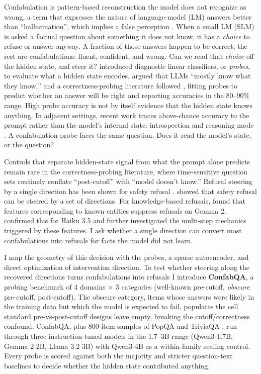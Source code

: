 Confabulation is pattern-based reconstruction the model does not recognize as wrong, 
a term that expresses the nature of language-model (LM) answers better than ``hallucination'', which implies a false perception \citep{smith2023confabulation, farquhar2024semantic}. 
When a small LM (SLM) is asked a factual question about
something it does not know, it has a \emph{choice} to refuse or answer anyway.
A fraction of those answers happen to be correct; the rest are
confabulations: fluent, confident, and wrong.
Can we read that \emph{choice} off the
hidden state, and steer it? \citet{alain2017probes} introduced diagnostic linear classifiers, or
\emph{probes}, to evaluate what a hidden state encodes. \citet{kadavath2022know}
argued that LLMs ``mostly know what they know,'' and a correctness-probing
literature followed
\citep{azaria2023internal, marks2024geometry, orgad2024show, kossen2024semantic}, fitting probes to predict
whether an answer will be right and reporting accuracies in the \(80\)--\(90\%\) range.
High probe accuracy is not by itself evidence that the hidden state
knows anything. In adjacent settings, recent work traces above-chance
accuracy to the prompt rather than the model's internal state:
introspection \citep{singh2026introspect} and reasoning mode
\citep{sahoo2026linear}. A confabulation probe faces the same question.
Does it read the model's state, or the question?

Controls that separate hidden-state signal from what the prompt alone
predicts remain rare in the correctness-probing literature, where
time-sensitive question sets routinely conflate ``post-cutoff'' with
``model doesn't know.'' Refusal steering by a single direction has been shown for safety refusal \citep{arditi2024refusal}.
\citet{wollschlager2025geometry} showed that safety refusal can be steered by a set of directions. 
For knowledge-based refusals, \citet{ferrando2025entity} found that features corresponding to known entities suppress refusals on Gemma 2. 
\citet{lindsey2025biology} confirmed this for Haiku 3.5 and further investigated the multi-step mechanics triggered by these features.
I ask whether a single direction can convert most confabulations into refusals for facts the model did not learn.

I map the geometry of this decision with the probes, a sparse
autoencoder, and direct optimization of intervention direction.
To test whether steering along the recovered directions turns
confabulations into refusals I introduce \textbf{ConfabQA}, a probing benchmark of 4 domains
\(\times\) 3 categories (well-known pre-cutoff, \emph{obscure}
pre-cutoff, post-cutoff). The obscure category, items whose answers were likely in the training data but which the model is expected to fail, populates
the cell standard pre-vs-post-cutoff designs leave empty, breaking the
cutoff/correctness confound. ConfabQA, plus 800-item samples of PopQA
\citep{mallen2023popqa} and TriviaQA \citep{joshi2017triviaqa}, run through three
instruction-tuned models in the \(1.7\)--\(3\)B range (Qwen3-1.7B,
Gemma 2 2B, Llama 3.2 3B) with Qwen3-4B as a within-family scaling
control. Every probe is scored against both the majority and stricter question-text baselines to decide whether the
hidden state contributed anything.

